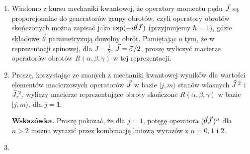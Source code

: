\documentclass[a4paper,11pt]{article}
\begin{document}
\begin{enumerate}
\item Wiadomo z kursu mechaniki kwantowej, że operatory momentu pędu $\vec{ J }$ są proporcjonalne do generatorów grupy obrotów, czyli operatory obrotów skończonych można zapisać jako $\exp( -i \vec{ \theta } \vec{ J } \, )$ (przyjmujemy $\hbar = 1$), gdzie składowe $\vec{ \theta }$ parametryzują dowolny obrót. Pamiętając o tym, że w reprezentacji spinowej, dla $J = \frac{ 1 }{ 2 }$, $\vec{ J } = \vec{ \sigma } / 2$, proszę wyliczyć macierze operatorów obrotów $R( \alpha, \beta, \gamma )$ w tej reprezentacji.

\item Proszę, korzystając ze znanych z mechaniki kwantowej wyników dla wartości elementów macierzowych operatorów $\vec{ J }$ w bazie $| j, m \rangle$ stanów własnych $\widehat{J}^{ \; 2 }$ i $\widehat{J}_{ z }^{ \; 2 }$, wyliczy macierze reprezentujące obroty skończone $R( \alpha, \beta, \gamma )$ w bazie $| j, m \rangle$, dla $j = 1$.

  \textbf{Wskazówka.} Proszę pokazać, że dla $j = 1$, potęgę operatora $( \vec{ \theta } \vec{ J } \, )^{ n }$ dla $n > 2$ można wyrazić przez kombinację liniową wyrazów z $n = 0, 1$ i $2$.

\item

\end{enumerate}





















\end{document}
